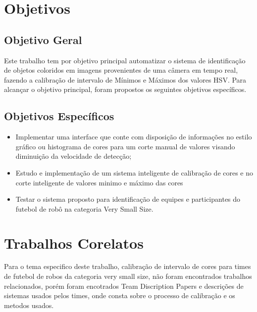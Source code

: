 \section{Objetivos} \label{Sec:Objetivos}

\subsection{Objetivo Geral} \label{Sec:ObjetivoGeral}
Este trabalho tem por objetivo principal automatizar o sistema de identificação de objetos 
coloridos em imagens provenientes de uma câmera  em tempo real, fazendo a calibração de intervalo de Mínimos e Máximos dos valores HSV.  
Para alcançar o objetivo principal, foram propostos os seguintes objetivos específicos.

\subsection{Objetivos Específicos} \label{Sec:ObjetivosEspecificos}

\begin{itemize}
	
	\item Implementar uma interface que conte com disposição de informações no estilo gráfico ou histograma de cores para um corte manual de valores
	visando diminuição da velocidade de detecção; 
	\item Estudo e implementação de um sistema inteligente de calibração de cores e no corte inteligente de valores minimo e máximo das cores
	\item Testar o sistema proposto para identificação de equipes e participantes do futebol 
	de robô na categoria Very Small Size. 
	
	
\end{itemize}

\newpage

\section{Trabalhos Corelatos}
Para o tema especifico deste trabalho, calibração de intervalo de cores para times de futebol de robos da categoria very small size, não foram encontrados trabalhos relacionados, porém foram encotrados Team Discription Papers e descrições de sistemas usados pelos times, onde consta sobre o processo de calibração e os metodos usados.

